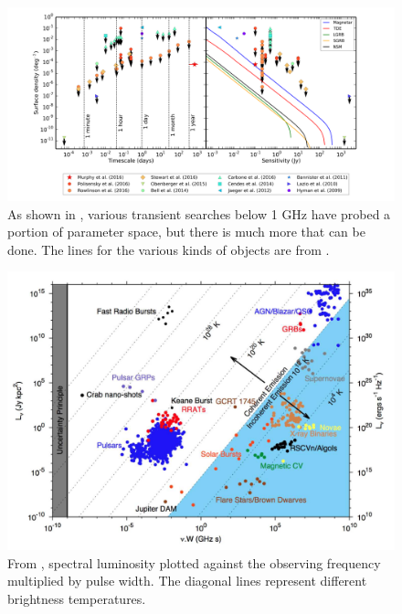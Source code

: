 \documentclass[12pt]{article}
\begin{document}
	\begin{figure}
		\includegraphics[width=\textwidth]{rates.png}
		\caption{As shown in \cite{2017MNRAS.466.1944M}, various transient searches below 1 GHz have probed a portion of parameter space, but there is much more that can be done. The lines for the various kinds of objects are from \cite{2015ApJ...806..224M}.}
		\label{murphy2017}
	\end{figure}


	\begin{figure}
		\begin{center}
			\includegraphics[width=\textwidth]{dario_var_lum.png}
			\caption{From \cite{2015MNRAS.446.3687P}, spectral luminosity plotted against the observing frequency multiplied by pulse width. The diagonal lines represent different brightness temperatures.}
			\label{dario_var_lum}	
		\end{center}
	\end{figure}
\end{document}
